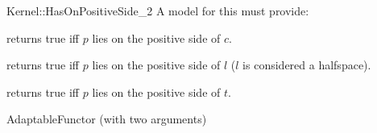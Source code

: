 \begin{ccRefFunctionObjectConcept}{Kernel::HasOnPositiveSide_2}
A model for this must provide:


{returns true iff $p$ lies on the positive side of $c$.}

{returns true iff $p$ lies on the positive side of $l$ 
($l$ is considered a halfspace).}

{returns true iff $p$ lies on the positive side of $t$.}

\ccRefines
AdaptableFunctor (with two arguments)

\ccSeeAlso
{} \\
\\
\\

\end{ccRefFunctionObjectConcept}

